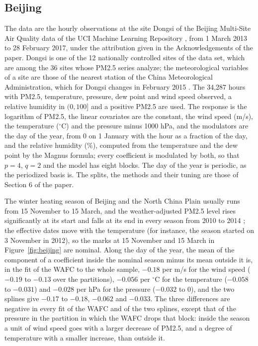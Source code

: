 \documentclass[10pt]{book}
\theoremstyle{definition}
\begin{document}
{



\subsection*{Beijing}

The data are the hourly observations at the site Dongsi of the Beijing
Multi-Site Air Quality data of the UCI Machine Learning Repository
\citep{Chen-UCI-2017}, from 1 March 2013 to 28 February 2017, under the
attribution given in the Acknowledgements of the paper. Dongsi is one of
the 12 nationally controlled sites of the data set, which are among the 36
sites whose PM2.5 series \citet{Zhang-Guo-Dong-He-Xu-Chen-2017} analyze;
the meteorological variables of a site are those of the nearest station of
the China Meteorological Administration, which for Dongsi changes in
February 2015 \citep[Table~S1 of their Supplementary
Material]{Zhang-Guo-Dong-He-Xu-Chen-2017}. The 34,287 hours with PM2.5,
temperature, pressure, dew point and wind speed observed, a relative humidity in $(0,100]$
and a positive PM2.5 are used. The response is the logarithm of PM2.5, the
linear covariates are the constant, the wind speed (m/s), the temperature
($^{\circ}$C) and the pressure minus 1000 hPa, and the modulators are the day
of the year, from 0 on 1 January with the hour as a fraction of the day, and
the relative humidity (\%), computed from the temperature and the dew point by
the Magnus formula; every coefficient is modulated by both, so that $p = 4$,
$q = 2$ and the model has eight blocks. The day of the year is periodic, as
the periodized basis is. The splits, the methods and their tuning are those
of Section 6 of the paper.

The winter heating season of Beijing and the North China Plain usually runs
from 15 November to 15 March, and the weather-adjusted PM2.5 level rises
significantly at its start and falls at its end in every season from 2010 to
2014 \citep[Section~7]{Liang-Zou-Guo-Li-Zhang-Zhang-Huang-Chen-2015}; the
effective dates move with the temperature (for instance, the season started
on 3 November in 2012), so the marks at 15 November and 15 March in
Figure~\ref{fig:beijing} are nominal. Along the day of the year, the mean of
the component of a coefficient inside the nominal season minus its mean
outside it is, in the fit of the WAFC to the whole sample, $-0.18$ per m/s
for the wind speed ($-0.19$ to $-0.13$ over the partitions), $-0.056$ per
$^{\circ}$C for the temperature ($-0.058$ to $-0.031$) and $-0.028$ per hPa
for the pressure ($-0.032$ to 0), and the two splines give $-0.17$ to
$-0.18$, $-0.062$ and $-0.033$. The three differences are negative in every
fit of the WAFC and of the two splines, except that of the pressure in the
partition in which the WAFC drops that block: inside the season a unit of
wind speed goes with a larger decrease of PM2.5, and a degree of temperature
with a smaller increase, than outside it.


\clearpage
}

\bibhang=1.7pc
\bibsep=2pt
\fontsize{9}{14pt plus.8pt minus .6pt}\selectfont
\renewcommand\bibname{\large \bf References}


\end{document}
